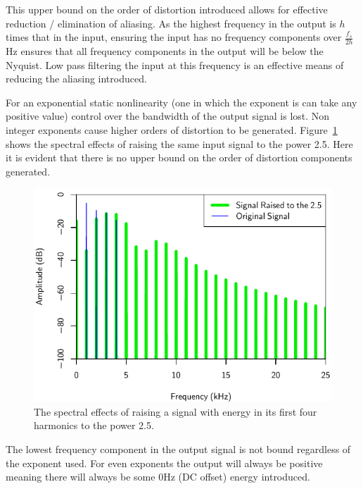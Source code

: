 			This upper bound on the order of distortion introduced allows for effective reduction / elimination
			of aliasing. As the highest frequency in the output is $h$ times that in the input, ensuring the
			input has no frequency components over $\frac{f_{s}}{2h}$Hz ensures that all frequency components
			in the output will be below the Nyquist. Low pass filtering the input at this frequency is an
			effective means of reducing the aliasing introduced.

			For an exponential static nonlinearity (one in which the exponent is can take any positive value)
			control over the bandwidth of the output signal is lost. Non integer exponents cause higher orders
			of distortion to be generated. Figure~\ref{fig:TwoAndAHalfSpectra} shows the spectral effects of
			raising the same input signal to the power 2.5. Here it is evident that there is no upper bound on
			the order of distortion components generated.

			\begin{figure}[h!]
				\centering
				\includegraphics{chapter5/Images/RaisedToTwoAndAHalfSpectra.pdf}
				\caption{The spectral effects of raising a signal with energy in its first four harmonics
					 to the power 2.5.}
				\label{fig:TwoAndAHalfSpectra}
			\end{figure}

			The lowest frequency component in the output signal is not bound regardless of the exponent used.
			For even exponents the output will always be positive meaning there will always be some 0Hz (DC
			offset) energy introduced.

